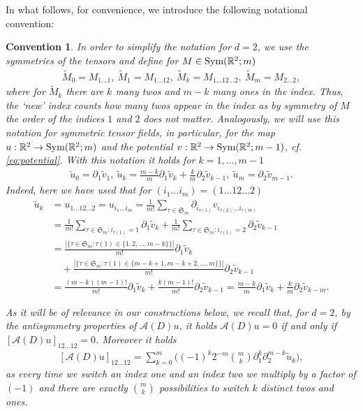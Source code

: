 \documentclass[a4paper, 10pt, twoside, notitlepage]{amsart}
\theoremstyle{plain}
\newtheorem{con}[prop]{Convention}
\newcommand{\R}{\mathbb{R}}
\newcommand{\p}{\partial}
\newcommand{\A}{\mathcal{A}}
\begin{document}
		In what follows, for convenience, we introduce the following notational convention:
		
                \begin{con} \label{rmk:Notation-2D}
                   In order to simplify the notation for $d=2$, we use the symmetries of the tensors and define for $M \in \textup{Sym}(\R^2;m)$
                    \begin{align*}
                      \tilde{M}_0 = M_{1\dots1}, \ \tilde{M}_1 = M_{1\dots12}, \ \tilde{M}_k = M_{1\dots12\dots2},\  \tilde{M}_m = M_{2\dots2},
                    \end{align*}
                    where for $\tilde{M}_k$ there are $k$ many twos and $m-k$ many ones in the index.  Thus, the `new' index counts how many twos appear in the index as by symmetry of $M$ the order of the indices $1$ and $2$ does not matter.  Analogously, we will use this notation for symmetric tensor fields, in particular, for the map $u:\R^2 \to \textup{Sym}(\R^2;m)$ and the potential $v:\R^2 \to \textup{Sym}(\R^2;m-1)$, cf. \eqref{eq:potential}.  With this notation it
                    holds for $k =1,\dots,m-1$
                    \begin{align*}
                      \tilde{u}_0 = \p_1 \tilde{v}_1,\ \tilde{u}_k = \frac{m-k}{m} \p_1 \tilde{v}_{k} + \frac{k}{m} \p_2 \tilde{v}_{k-1},\ \tilde{u}_m = \p_2 \tilde{v}_{m-1}.
                    \end{align*}
			Indeed, here we have used that for $(i_1 \dots i_m)=(1\dots12\dots2)$
			\begin{align*}
				\tilde{u}_k &= u_{1\dots12\dots2} = u_{i_1 \dots i_m} =  \frac{1}{m!} \sum_{\tau \in \mathfrak{S}_m} \p_{i_{\tau(1)}} v_{i_{\tau(2)} \dots i_{\tau(m)}} \\
				& = \frac{1}{m!} \sum_{\tau \in \mathfrak{S}_m: i_{\tau(1)} = 1} \p_1 \tilde{v}_{k} + \frac{1}{m!} \sum_{\tau \in \mathfrak{S}_m: i_{\tau(1)} = 2} \p_2 \tilde{v}_{k-1} \\
				& = \frac{|\{\tau \in \mathfrak{S}_m: \tau(1) \in \{1,2,\dots,m-k\}\}|}{m!} \p_1 \tilde{v}_k \\
				& \quad + \frac{|\{\tau \in \mathfrak{S}_m: \tau(1) \in \{m-k+1,m-k+2,\dots,m\}\}|}{m!} \p_2 \tilde{v}_{k-1} \\
				& = \frac{(m-k) (m-1)!}{m!} \p_1 \tilde{v}_k + \frac{k (m-1)!}{m!} \p_2 \tilde{v}_{k-1} = \frac{m-k}{m} \p_1 \tilde{v}_{k} + \frac{k}{m} \p_2 \tilde{v}_{k-m}.
			\end{align*}
		
		
		As it will be of relevance in our constructions below, we recall that, for $d=2$, by the antisymmetry properties of $\A(D)u$, it holds $\A(D)u = 0$ if and only if
		$[\A(D)u]_{12\dots12} = 0$.  Moreover it holds
		\begin{align}
                  \label{eq:Operator2d} [\A(D)u]_{12\dots12} = \sum_{k=0}^m \Big( (-1)^k 2^{-m} \binom{m}{k} \p_1^k \p_2^{m-k} \tilde{u}_k \Big),
		\end{align}
		as every time we switch an index one and an index two we multiply by a factor of $(-1)$ and there are exactly $\binom{m}{k}$ possibilities to switch $k$ distinct twos and ones.
              \end{con}
		
\end{document}
